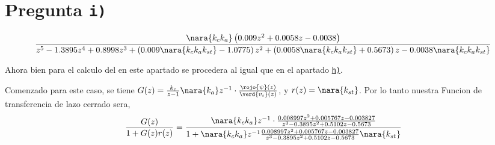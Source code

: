 \section{Pregunta \texttt{i)}}\label{pregunta-i}




\begin{equation}
    \frac{ \nara{k_c k_a} \left( 0.009 z^2 + 0.0058 z - 0.0038 \right)}
    { z^5 -1.3895z^4 + 0.8998z^3 + \left( 0.009\nara{k_c k_a k_{st}}  -1.0775 \right) z^2 
    + \left(0.0058 \nara{k_c k_a k_{st}}   + 0.5673 \right) z 
    -0.0038 \nara{k_c k_a k_{st}} }
\end{equation}


Ahora bien para el calculo del  en este apartado se procedera al igual que en el apartado \hyperref[pregunta-h]{\texttt{h)}}.

Comenzado para este caso, se tiene $G(z) = \frac{k_{c}}{z-1}\nara{ k_{a}} z^{-1} \cdot \frac{\rojo{\psi}(z)}{\verd{v_i}(z)}$,
y $r(z) = \nara{k_{st}}$. Por lo tanto nuestra Funcion de transferencia de lazo cerrado sera,
\begin{equation}
    \frac{G(z)}{1 + G(z)r(z)} = \dfrac{\nara{k_ck_a} z^{-1} \cdot\frac{0.008997z^2 + 0.005767 z - 0.003827}
    {z^3 - 0.3895 z^2 + 0.5102 z -0.5673}}
    {1+\nara{k_ck_a} z^{-1} \frac{0.008997z^2 + 0.005767 z - 0.003827}
    {z^3 - 0.3895 z^2 + 0.5102 z -0.5673}\nara{k_{st}}}
\end{equation}